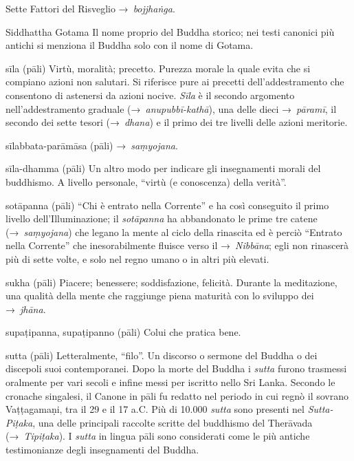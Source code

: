 \begin{glossarydescription}
\item[Sette Fattori del Risveglio] →~\emph{bojjhaṅga}.

\item[Siddhattha Gotama] Il nome proprio del Buddha storico; nei testi canonici
  più antichi si menziona il Buddha solo con il nome di Gotama.

\item[sīla] (pāli) Virtù, moralità; precetto. Purezza morale la quale evita che
  si compiano azioni non salutari. Si riferisce pure ai precetti
  dell'addestramento che consentono di astenersi da azioni nocive. \emph{Sīla} è
  il secondo argomento nell'addestramento graduale (→~\emph{anupubbī-kathā}),
  una delle dieci →~\emph{pāramī}, il secondo dei sette tesori (→~\emph{dhana})
  e il primo dei tre livelli delle azioni meritorie.

\item[sīlabbata-parāmāsa] (pāli) →~\emph{saṃyojana}.

\item[sīla-dhamma] (pāli) Un altro modo per indicare gli insegnamenti morali del
  buddhismo. A livello personale, ``virtù (e conoscenza) della verità''.

\item[sotāpanna] (pāli) ``Chi è entrato nella Corrente'' e ha così conseguito il
  primo livello dell'Illuminazione; il \emph{sotāpanna} ha abbandonato le prime
  tre catene (→~\emph{saṃyojana}) che legano la mente al ciclo della rinascita
  ed è perciò ``Entrato nella Corrente'' che inesorabilmente fluisce verso il
  →~\emph{Nibbāna}; egli non rinascerà più di sette volte, e solo nel regno
  umano o in altri più elevati.

\item[sukha] (pāli) Piacere; benessere; soddisfazione, felicità. Durante la
  meditazione, una qualità della mente che raggiunge piena maturità con lo
  sviluppo dei →~\emph{jhāna}.

\item[supaṭipanna, supaṭipanno] (pāli) Colui che pratica bene.

\item[sutta] (pāli) Letteralmente, ``filo''. Un discorso o sermone del Buddha o
  dei discepoli suoi contemporanei. Dopo la morte del Buddha i \emph{sutta}
  furono trasmessi oralmente per vari secoli e infine messi per iscritto nello
  Sri Lanka. Secondo le cronache singalesi, il Canone in pāli fu redatto nel
  periodo in cui regnò il sovrano Vaṭṭagamaṇi, tra il 29 e il 17 a.C. Più di
  10.000 \emph{sutta} sono presenti nel \emph{Sutta-Piṭaka}, una delle
  principali raccolte scritte del buddhismo del Therāvada (→~\emph{Tipiṭaka}). I
  \emph{sutta} in lingua pāli sono considerati come le più antiche testimonianze
  degli insegnamenti del Buddha.


\end{glossarydescription}
